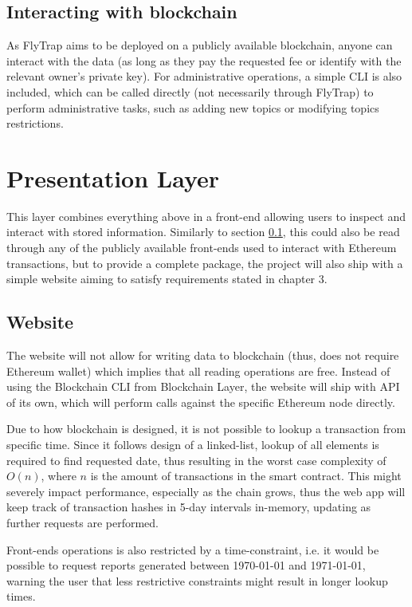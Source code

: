 \subsection{Interacting with blockchain}\label{sec:interact}
As FlyTrap aims to be deployed on a publicly available blockchain, anyone can interact with the data (as long as they pay the requested fee or identify with the relevant owner's private key). For administrative operations, a simple CLI is also included, which can be called directly (not necessarily through FlyTrap) to perform administrative tasks, such as adding new topics or modifying topics restrictions.

\section{Presentation Layer}
This layer combines everything above in a front-end allowing users to inspect and interact with stored information. Similarly to section \ref{sec:interact}, this could also be read through any of the publicly available front-ends used to interact with Ethereum transactions, but to provide a complete package, the project will also ship with a simple website aiming to satisfy requirements stated in chapter 3.
\subsection{Website}
The website will not allow for writing data to blockchain (thus, does not require Ethereum wallet) which implies that all reading operations are free. Instead of using the Blockchain CLI from Blockchain Layer, the website will ship with API of its own, which will perform calls against the specific Ethereum node directly.

Due to how blockchain is designed, it is not possible to lookup a transaction from specific time. Since it follows design of a linked-list, lookup of all elements is required to find requested date, thus resulting in the worst case complexity of $O(n)$, where $n$ is the amount of transactions in the smart contract. This might severely impact performance, especially as the chain grows, thus the web app will keep track of transaction hashes in 5-day intervals in-memory, updating as further requests are performed.

Front-ends operations is also restricted by a time-constraint, i.e. it would be possible to request reports generated between 1970-01-01 and 1971-01-01, warning the user that less restrictive constraints might result in longer lookup times.
